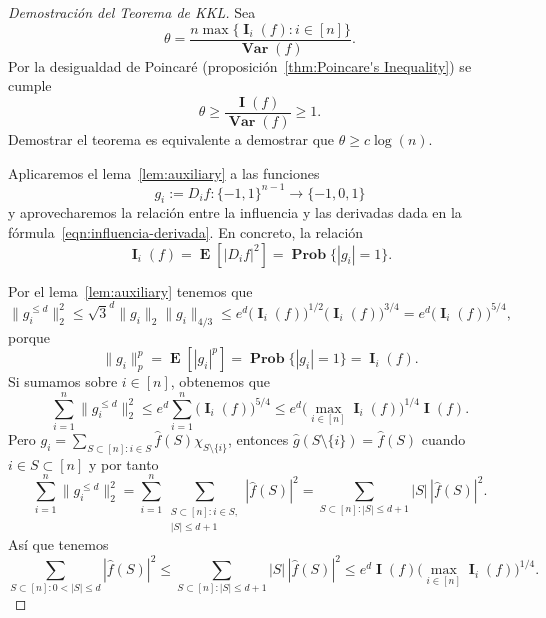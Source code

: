 \documentclass[autocontact]{gaceta}
\DeclareMathOperator{\Var}{\mathbf{Var}}
\DeclareMathOperator{\II}{\mathbf{I}}
\DeclareMathOperator{\EE}{\mathbf{E}}
\DeclareMathOperator{\Prob}{\mathbf{Prob}}
\begin{document}
\begin{proof}[Demostración del Teorema de KKL]
Sea
\[
\theta = \frac{n \max\{\II_i(f): i\in[n]\} }{\Var(f)}.
\]
Por la desigualdad de Poincaré (proposición~\ref{thm:Poincare's Inequality}) se cumple
\[
   \theta \geq \frac{\II(f)}{\Var(f)}\geq 1.
\]
Demostrar el teorema es equivalente a demostrar que $\theta \geq c \log(n)$.

Aplicaremos el lema~\ref{lem:auxiliary} a las funciones
\[
 g_i:= D_if: \{-1,1\}^{n-1}\to \{-1,0,1\}
\]
y aprovecharemos la relación entre la influencia y las derivadas dada en la fórmula~\eqref{eqn:influencia-derivada}. En concreto, la relación
\[
\II_i(f) = \EE[|D_if|^2]=\Prob\big\{|g_i|= 1 \big\}.
\]

Por el lema~\ref{lem:auxiliary} tenemos que
\[
    \|g_i^{\leq d} \|_2^2
    \leq \sqrt{3}^d \|g_i\|_2\|g_i\|_{4/3}
    \leq e^d\big(\II_i(f)\big)^{1/2}\big(\II_i(f)\big)^{3/4}
    = e^d\big(\II_i(f)\big)^{5/4},
\]
porque
\[
   \|g_i\|_p^p=\EE[|g_i|^p]=\Prob \big\{ |g_i|= 1\big\} = \II_i(f).
\]
Si sumamos sobre $i\in [n]$, obtenemos que
\[
\sum_{i=1}^n\|g_i^{\leq d} \|_2^2 \leq e^d \sum_{i=1}^n \big(\II_i(f)\big)^{5/4}
\leq e^d \big(\max_{i\in [n]}\II_i(f)\big)^{1/4} \II(f).
\]
Pero $g_i=\sum_{S\subset [n] \colon i\in S}\widehat{f}(S)\chi_{S\setminus \{i\}}$, entonces $\widehat{g}(S\setminus \{i\})=\widehat{f}(S)$ cuando $i\in S\subset [n]$ y por tanto
\[
   \sum_{i=1}^n\|g_i^{\leq d} \|_2^2
   = \sum_{i=1}^n \sum_{\substack{S\subset [n] \colon i\in S,\\ |S|\leq d+1}} |\widehat{f}(S)|^2
   = \sum_{S\subset [n] \colon |S|\leq d+1} |S| \, |\widehat{f}(S)|^2.
\]
Así que tenemos
\begin{equation}\label{eq:(*)}
   \sum_{S\subset [n] \colon 0<|S|\leq d} |\widehat{f}(S)|^2
   \leq \sum_{S\subset [n] \colon |S|\leq d+1} |S| \, |\widehat{f}(S)|^2
   \leq e^d \II(f) \big(\max_{i\in [n]} \II_i(f)\big)^{1/4}.
\end{equation}


\end{proof}
\end{document}
